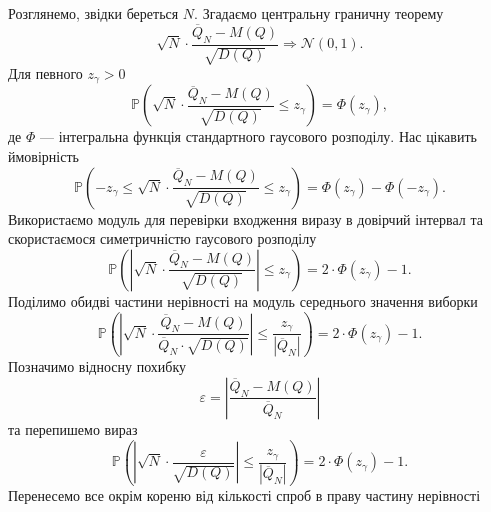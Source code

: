 Розглянемо, звідки береться $N$.
Згадаємо центральну граничну теорему
\begin{equation*}
  \sqrt{N}
    \cdot \frac{\overline{Q}_N - M\left( Q \right)}
    {\sqrt{D\left( Q \right)}} \Rightarrow \mathcal{N}\left( 0, 1 \right).
\end{equation*}
Для певного $z_{\gamma} > 0$
\begin{equation*}
  \mathbb{P}\left(
    \sqrt{N}
    \cdot \frac{\overline{Q}_N - M\left( Q \right)}{\sqrt{D\left( Q \right)}}
    \le z_{\gamma}
  \right) = \Phi\left( z_{\gamma} \right),
\end{equation*}
де $\Phi$ --- інтегральна функція стандартного гаусового розподілу.
Нас цікавить ймовірність
\begin{equation*}
  \mathbb{P}\left(
    -z_{\gamma} \le
    \sqrt{N}
    \cdot \frac{\overline{Q}_N - M\left( Q \right)}{\sqrt{D\left( Q \right)}}
    \le z_{\gamma}
  \right)
  = \Phi\left( z_{\gamma} \right) - \Phi\left( -z_{\gamma} \right).
\end{equation*}
Використаємо модуль для перевірки входження виразу в довірчий інтервал
та скористаємося симетричністю гаусового розподілу
\begin{equation*}
  \mathbb{P}\left(
    \left|
      \sqrt{N}
      \cdot \frac{\overline{Q}_N - M\left( Q \right)}{\sqrt{D\left( Q \right)}}
    \right|
    \le z_{\gamma}
  \right)
  = 2 \cdot \Phi\left( z_{\gamma} \right) - 1.
\end{equation*}
Поділимо обидві частини нерівності на модуль середнього значення виборки
\begin{equation*}
  \mathbb{P}\left(
    \left|
      \sqrt{N}
      \cdot \frac{\overline{Q}_N - M\left( Q \right)}
        {\overline{Q}_N \cdot \sqrt{D\left( Q \right)}}
    \right|
    \le \frac{z_{\gamma}}{\left| \overline{Q}_N \right|}
  \right)
  = 2 \cdot \Phi\left( z_{\gamma} \right) - 1.
\end{equation*}
Позначимо відносну похибку
\begin{equation*}
  \varepsilon
  = \left| \frac{\overline{Q}_N - M\left( Q \right)}{\overline{Q}_N} \right|
\end{equation*}
та перепишемо вираз
\begin{equation*}
  \mathbb{P}\left(
    \left|
      \sqrt{N}
      \cdot \frac{\varepsilon}
        {\sqrt{D\left( Q \right)}}
    \right|
    \le \frac{z_{\gamma}}{\left| \overline{Q}_N \right|}
  \right)
  = 2 \cdot \Phi\left( z_{\gamma} \right) - 1.
\end{equation*}
Перенесемо все окрім кореню від кількості спроб в праву частину нерівності
